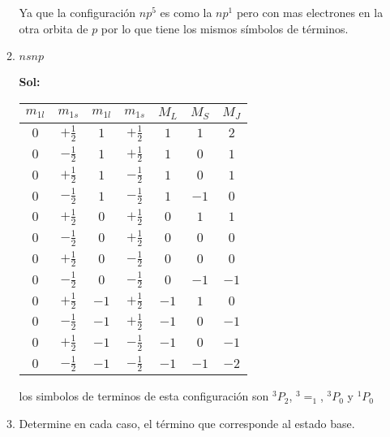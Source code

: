 \documentclass[12pt,a4paper]{article}
\begin{document}
\begin{enumerate}
\begin{enumerate}
    Ya que la configuración $np^5$ es como la $np^1$ pero con mas electrones en la otra orbita de $p$ por lo que tiene los mismos símbolos de términos.
    
    
    
    \item $nsnp$
    
    \textbf{Sol:}
    
    \begin{table}[h!]
        \centering
        \begin{tabular}{|c|c|c|c|c|c|c|}
        \hline
            $m_{1l}$ & $m_{1s}$ &$m_{1l}$ & $m_{1s}$ & $M_L$ & $M_S$ & $M_J$  \\
            \hline
             $0$ & $+\frac{1}{2}$ & $1$ & $+\frac{1}{2}$& $1$ &$1$ & $2$\\
             $0$ & $-\frac{1}{2}$ &$1$ & $+\frac{1}{2}$& $1$ &$0$ & $1$\\
             $0$ & $+\frac{1}{2}$ &$1$ & $-\frac{1}{2}$&$1$ &$0$ & $1$\\
             $0$ & $-\frac{1}{2}$ & $1$ & $-\frac{1}{2}$&$1$ &$-1$ & $0$\\
             $0$ & $+\frac{1}{2}$ & $0$ & $+\frac{1}{2}$& $0$ &$1$ & $1$\\
             $0$ & $-\frac{1}{2}$ &  $0$ & $+\frac{1}{2}$& $0$ &$0$ & $0$\\
             $0$ & $+\frac{1}{2}$ & $0$ & $-\frac{1}{2}$& $0$ &$0$ & $0$\\
             $0$ & $-\frac{1}{2}$ &$0$ & $-\frac{1}{2}$& $0$ &$-1$ & $-1$\\
             $0$ & $+\frac{1}{2}$ &$-1$ & $+\frac{1}{2}$& $-1$ &$1$ &  $0$\\
             $0$ & $-\frac{1}{2}$ & $-1$ & $+\frac{1}{2}$& $-1$ &$0$ & $-1$\\
             $0$ & $+\frac{1}{2}$ & $-1$ & $-\frac{1}{2}$& $-1$ &$0$ & $-1$\\
             $0$ & $-\frac{1}{2}$ &  $-1$ & $-\frac{1}{2}$& $-1$ &$-1$ & $-2$\\
             \hline
        \end{tabular}
    \end{table}
    
    los simbolos de terminos de esta configuración son $^3P_2$, $^3=_1$, $^3P_0$ y $^1P_0$
    
    \item Determine en cada caso, el término que corresponde al estado base.
    

\end{enumerate}
\end{enumerate}
\end{document}
